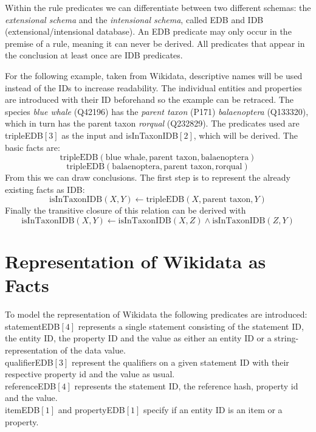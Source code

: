 \documentclass[hyperref,bachelorofscience,fleqn]{cgvpub}
\begin{document}
Within the rule predicates we can differentiate between two different schemas: the \emph{extensional schema} and the \emph{intensional schema}, called EDB and IDB (extensional/intensional database). An EDB predicate may only occur in the premise of a rule, meaning it can never be derived. All predicates that appear in the conclusion at least once are IDB predicates.

For the following example, taken from Wikidata, descriptive names will be used instead of the IDs to increase readability. The individual entities and properties are introduced with their ID beforehand so the example can be retraced. The species \emph{blue whale} (Q42196) has the \emph{parent taxon} (P171) \emph{balaenoptera} (Q133320), which in turn has the parent taxon \emph{rorqual} (Q232829). The predicates used are tripleEDB\([3]\) as the input and isInTaxonIDB\([2]\), which will be derived. The basic facts are:
\[\text{tripleEDB}(\text{blue whale}, \text{parent taxon}, \text{balaenoptera})\]
\[\text{tripleEDB}(\text{balaenoptera}, \text{parent taxon}, \text{rorqual})\]
From this we can draw conclusions. The first step is to represent the already existing facts as IDB:
\[\text{isInTaxonIDB}(X, Y) \leftarrow \text{tripleEDB}(X, \text{parent taxon}, Y)\]
Finally the transitive closure of this relation can be derived with
\[\text{isInTaxonIDB}(X, Y) \leftarrow \text{isInTaxonIDB}(X, Z) \wedge \text{isInTaxonIDB}(Z, Y)\]

\section{Representation of Wikidata as Facts}
To model the representation of Wikidata the following predicates are introduced:\\
statementEDB\([4]\) represents a single statement consisting of the statement ID, the entity ID, the property ID and the value as either an entity ID or a string-representation of the data value.\\
qualifierEDB\([3]\) represent the qualifiers on a given statement ID with their respective property id and the value as usual. \\
referenceEDB\([4]\) represents the statement ID, the reference hash, property id and the value.\\
itemEDB\([1]\) and propertyEDB\([1]\) specify if an entity ID is an item or a property.\\
\end{document}
